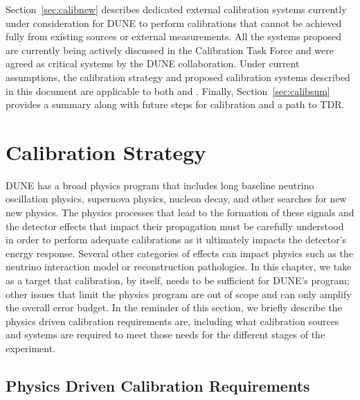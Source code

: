 Section~\ref{sec:calibnew} describes dedicated external calibration systems currently under consideration for DUNE to perform calibrations that cannot be achieved fully from existing sources or external measurements. All the systems proposed are currently being actively discussed in the Calibration Task Force and were agreed as critical systems by the DUNE collaboration. Under current assumptions, the calibration strategy and proposed calibration systems described in this document are applicable to both  and . %
Finally, Section~\ref{sec:calibsum} provides a summary along with future steps for calibration and a path to TDR. 

\section{Calibration Strategy}
\label{sec:calibstrat} %
DUNE has a broad physics program that includes long baseline neutrino oscillation physics, supernova physics, nucleon decay, and other searches for new new physics. The physics processes that lead to the formation of these signals and the detector effects that impact their propagation must be carefully understood in order to perform adequate calibrations as it ultimately impacts the detector's energy response. Several other categories of effects can impact physics such as the neutrino interaction model or reconstruction pathologies. In this chapter, we take as a target that calibration, by itself, needs to be sufficient for DUNE's program; other issues that limit the physics program are out of scope and can only amplify the overall error budget. In the reminder of this section, we briefly describe the physics driven calibration requirements are, including what calibration sources and systems are required to meet those needs for the different stages of the experiment.

\subsection{Physics Driven Calibration Requirements}

